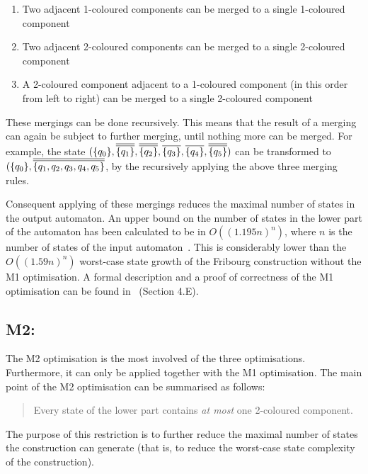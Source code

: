 \begin{enumerate}
\item Two adjacent 1-coloured components can be merged to a single 1-coloured component
\item Two adjacent 2-coloured components can be merged to a single 2-coloured component
\item A 2-coloured component adjacent to a 1-coloured component (in this order from left to right) can be merged to a single 2-coloured component
\end{enumerate}

These mergings can be done recursively. This means that the result of a merging can again be subject to further merging, until nothing more can be merged. For example, the state $(\qm0, \cl2{\qm1}, \cl2{\qm2}, \cl1{\qm3}, \cl1{\qm4}, \cl2{\qm5})$ can be transformed to $(\qm0, \cl2{\{q_1, q_2, q_3, q_4, q_5\}}$, by the recursively applying the above three merging rules.

Consequent applying of these mergings reduces the maximal number of states in the output automaton. An upper bound on the number of states in the lower part of the automaton has been calculated to be in $O((1.195n)^n)$, where $n$ is the number of states of the input automaton~\cite{2014_joel_ulrich}. This is considerably lower than the $O((1.59n)^n)$ worst-case state growth of the Fribourg construction without the M1 optimisation. A formal description and a proof of correctness of the M1 optimisation can be found in~\cite{2014_joel_ulrich} (Section 4.E).


\subsection{M2:  }
The M2 optimisation is the most involved of the three optimisations. Furthermore, it can only be applied together with the M1 optimisation. The main point of the M2 optimisation can be summarised as follows:

\begin{quote}
Every state of the lower part contains \textit{at most} one 2-coloured component.
\end{quote}

The purpose of this restriction is to further reduce the maximal number of states the construction can generate (that is, to reduce the worst-case state complexity of the construction).

